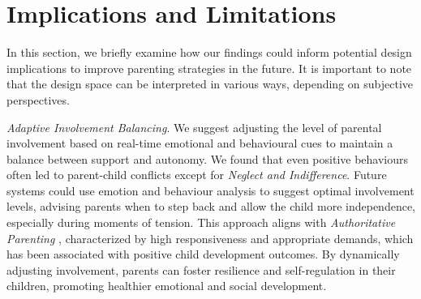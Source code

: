 \section{Implications and Limitations}
\label{sec:limit}
In this section, we briefly examine how our findings could inform potential design implications to improve parenting strategies in the future. It is important to note that the design space can be interpreted in various ways, depending on subjective perspectives.



\textit{Adaptive Involvement Balancing}.
We suggest adjusting the level of parental involvement based on real-time emotional and behavioural cues to maintain a balance between support and autonomy. 
We found that even positive behaviours often led to parent-child conflicts except for \textit{Neglect and Indifference}. 
Future systems could use emotion and behaviour analysis to suggest optimal involvement levels, advising parents when to step back and allow the child more independence, especially during moments of tension. This approach aligns with \textit{Authoritative Parenting} \cite{gray1999unpacking}, characterized by high responsiveness and appropriate demands, which has been associated with positive child development outcomes. By dynamically adjusting involvement, parents can foster resilience and self-regulation in their children, promoting healthier emotional and social development.



